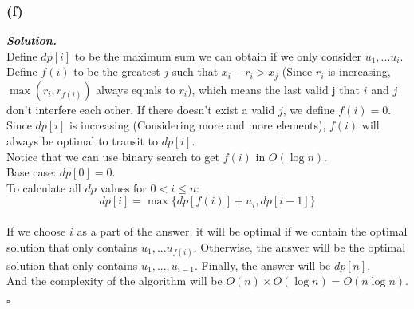 \documentclass[12pt, a4paper, UTF8]{article}
\newenvironment{solution}[1][\it{Solution}]{\textbf{#1. }\\}{\begin{flushright}$\square$\end{flushright}}
\begin{document}
        \subsubsection*{(f)}
            \begin{solution}
                Define $dp[i]$ to be the maximum sum we can obtain if we only consider $u_1,...u_i$.\\
                Define $f(i)$ to be the greatest $j$ such that $x_i - r_i > x_j$ (Since $r_i$ is increasing, $\max(r_i, r_{f(i)})$ always equals to $r_i$), which means the last valid j that $i$ and $j$ don't interfere each other. If there doesn't exist a valid $j$, we define $f(i) = 0$.\\
                Since $dp[i]$ is increasing (Considering more and more elements), $f(i)$ will always be optimal to transit to $dp[i]$.\\
                Notice that we can use binary search to get $f(i)$ in $O(\log{n})$.\\
                Base case: $dp[0] = 0$.\\
                To calculate all $dp$ values for $0 < i \le n$:\\
                $$dp[i] = \max\{dp[f(i)] + u_i, dp[i - 1]\}$$\\
                If we choose $i$ as a part of the answer, it will be optimal if we contain the optimal solution that only contains $u_1,...u_{f(i)}$. Otherwise, the answer will be the optimal solution that only contains $u_1,...,u_{i-1}$.
                Finally, the answer will be $dp[n]$.\\
                And the complexity of the algorithm will be $O(n) \times O(\log{n}) = O(n\log{n})$.
            \end{solution}
\end{document}
